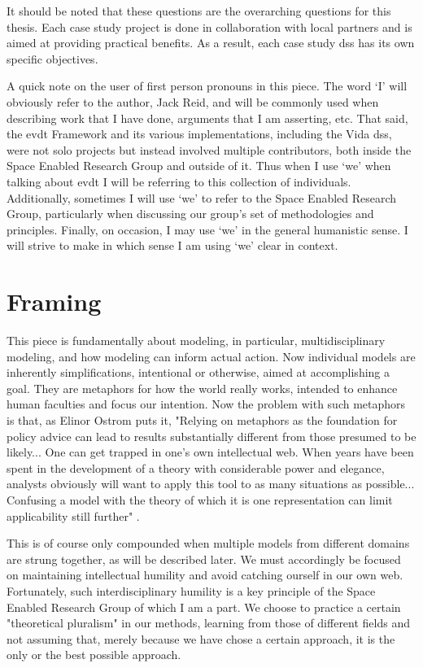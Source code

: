 It should be noted that these questions are the overarching questions for this thesis. Each case study project is done in collaboration with local partners and is aimed at providing practical benefits. As a result, each case study \ac{dss} has its own specific objectives.

A quick note on the user of first person pronouns in this piece. The word `I' will obviously refer to the author, Jack Reid, and will be commonly used when describing work that I have done, arguments that I am asserting, etc. That said, the \ac{evdt} Framework and its various implementations, including the Vida \ac{dss}, were not solo projects but instead involved multiple contributors, both inside the Space Enabled Research Group and outside of it. Thus when I use `we' when talking about \ac{evdt} I will be referring to this collection of individuals. Additionally, sometimes I will use `we' to refer to the Space Enabled Research Group, particularly when discussing our group's set of methodologies and principles. Finally, on occasion, I may use `we' in the general humanistic sense. I will strive to make in which sense I am using `we' clear in context.

\section{Framing}

This piece is fundamentally about modeling, in particular, multidisciplinary modeling, and how modeling can inform actual action. Now individual models are inherently simplifications, intentional or otherwise, aimed at accomplishing a goal. They are metaphors for how the world really works, intended to enhance human faculties and focus our intention. Now the problem with such metaphors is that, as Elinor Ostrom puts it, "Relying on metaphors as the foundation for policy advice can lead to results substantially different from those presumed to be likely... One can get trapped in one's own intellectual web. When years have been spent in the development of a theory with considerable power and elegance, analysts obviously will want to apply this tool to as many situations as possible... Confusing a model with the theory of which it is one representation can limit applicability still further" \cite{ostromGoverningCommonsEvolution2015}. 

This is of course only compounded when multiple models from different domains are strung together, as will be described later. We must accordingly be focused on maintaining intellectual humility and avoid catching ourself in our own web. Fortunately, such interdisciplinary humility is a key principle of the Space Enabled Research Group of which I am a part. We choose to practice a certain "theoretical pluralism" \cite{turkleEmpathyDiariesMemoir2021} in our methods, learning from those of different fields and not assuming that, merely because we have chose a certain approach, it is the only or the best possible approach.

